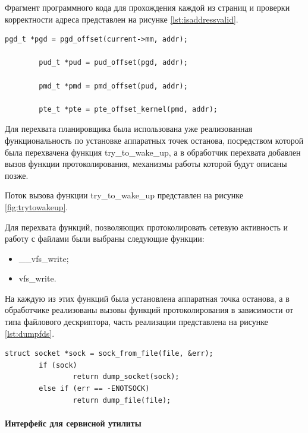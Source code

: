 \documentclass{gost7.32-2001}
\begin{document}
Фрагмент программного кода для прохождения каждой из страниц и
проверки корректности адреса представлен на рисунке
\ref{lst:isaddressvalid}.

\begin{lstlisting}[caption={Прохождение таблиц страниц},
    captionpos=b, float, label={lst:isaddressvalid}]
        pgd_t *pgd = pgd_offset(current->mm, addr);

        pud_t *pud = pud_offset(pgd, addr);

        pmd_t *pmd = pmd_offset(pud, addr);

        pte_t *pte = pte_offset_kernel(pmd, addr);
\end{lstlisting}

Для перехвата планировщика была использована уже реализованная
функциональность по установке аппаратных точек останова, посредством
которой была перехвачена функция try\_to\_wake\_up, а в обработчик
перехвата добавлен вызов функции протоколирования, механизмы работы
которой будут описаны позже.

Поток вызова функции try\_to\_wake\_up
представлен на рисунке \ref{fig:trytowakeup}.


Для перехвата функций, позволяющих протоколировать сетевую активность
и работу с файлами были выбраны следующие функции:
\begin{itemize}
\item
  \_\_vfs\_write;
\item
  vfs\_write.
\end{itemize}

На каждую из этих функций была установлена аппаратная точка останова,
а в обработчике реализованы вызовы функций протоколирования в
зависимости от типа файлового дескриптора, часть реализации
представлена на рисунке \ref{lst:dumpfds}.

\begin{lstlisting}[caption={Прохождение таблиц страниц},
    captionpos=b, float, label={lst:dumpfds}]
        struct socket *sock = sock_from_file(file, &err);
        if (sock)
                return dump_socket(sock);
        else if (err == -ENOTSOCK)
                return dump_file(file);
\end{lstlisting}

\newpage
\paragraph{Интерфейс для сервисной утилиты}
\end{document}
